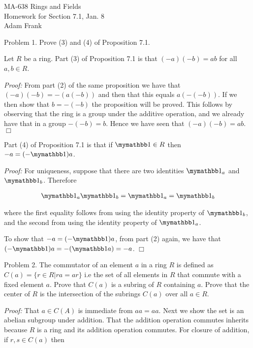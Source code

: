 \documentclass{article}
\begin{document}
  \begin{center} \Large
    MA-638 Rings and Fields\\
    Homework for Section 7.1, Jan. 8 \\
    Adam Frank
  \end{center}

  \vspace{1cm}

  {\Large \color{Sepia} Problem 1.  Prove (3) and (4) of Proposition 7.1.}

  Let $R$ be a ring.  Part (3) of Proposition 7.1 is that $(-a)(-b) = ab$ for all $a,b \in R$.

  {\it Proof:} From part (2) of the same proposition we have that $(-a)(-b) = -(a(-b))$ and then that this equals $a(-(-b))$.  If we then show that $b=-(-b)$ the proposition will be proved.  This follows by observing that the ring is a group under the additive operation, and we already have that in a group $-(-b) = b$. Hence we have seen that $(-a)(-b) = ab$. $\Box$

  Part (4) of Proposition 7.1 is that if $\mymathbb 1 \in R$ then $-a = (-\mymathbb 1)a$.

  {\it Proof:} For uniqueness, suppose that there are two identities $\mymathbb 1_a$ and $\mymathbb 1_b$.  Therefore

  \begin{align*}
    \mymathbb 1_a \mymathbb 1_b = \mymathbb 1_a = \mymathbb 1_b
  \end{align*}

  where the first equality follows from using the identity property of $\mymathbb 1_b$, and the second from using the identity property of $\mymathbb 1_a$.

  To show that $-a = (-\mymathbb 1)a$, from part (2) again, we have that $(-\mymathbb 1)a = -(\mymathbb 1a) = -a$. $\Box$

  \pagebreak

  {\Large \color{Sepia} Problem 2. The commutator of an element $a$ in a ring $R$ is defined as $ C(a) =\{r\in R|ra=ar \}$ i.e the set of all elements in $R$ that commute with a fixed element $a$.  Prove that $C(a)$ is a subring of $R$ containing $a$. Prove that the center of $R$ is the intersection of the subrings $C(a)$ over all $a \in R$.}

  {\it Proof:} That $a\in C(A)$ is immediate from $aa = aa$.  Next we show the set is an abelian subgroup under addition.  That the addition operation commutes inherits because $R$ is a ring and its addition operation commutes. For closure of addition, if $r,s\in C(a)$ then
\end{document}
